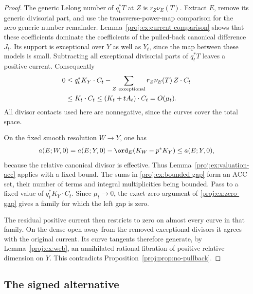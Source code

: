 \begin{proof}
The generic Lelong number of \(q_t^*T\) at \(Z\) is
\(r_Z\nu_E(T)\). Extract \(E\), remove its generic
divisorial part, and use the transverse-power-map
comparison for the zero-generic-number remainder.
Lemma~\ref{proj:ex:current-comparison} shows that these
coefficients dominate the coefficients of the pulled-back
canonical difference \(J_t\). Its support is exceptional
over \(Y\) as well as \(Y_t\), since the map between these
models is small. Subtracting all exceptional divisorial
parts of \(q_t^*T\) leaves a positive current. Consequently
\begin{equation}\label{proj:ex:bounded-gap}
 \begin{split}
 0&\leq q_t^*K_Y\cdot C_t
       -\sum_{Z\ {\rm exceptional}}
                r_Z\nu_E(T)\,Z\cdot C_t\\
  &\leq K_t\cdot C_t
   \leq (K_t+tA_t)\cdot C_t
   =O(\mu_t).
 \end{split}
\end{equation}
All divisor contacts used here are nonnegative, since the
curves cover the total space.

On the fixed smooth resolution \(W\to Y\), one has
\[
 a(E;W,0)=a(E;Y,0)
       -\ord_E(K_W-p^*K_Y)\leq a(E;Y,0),
\]
because the relative canonical divisor is effective.
Thus Lemma~\ref{proj:ex:valuation-acc} applies with a fixed
bound. The sums in \eqref{proj:ex:bounded-gap} form an ACC
set, their number of terms and integral multiplicities
being bounded. Pass to a fixed value of
\(q_t^*K_Y\cdot C_t\). Since \(\mu_t\to0\), the
exact-zero argument of \eqref{proj:ex:zero-gap} gives a family
for which the left gap is zero.

The residual positive current then restricts to zero on
almost every curve in that family. On the dense open
away from the removed exceptional divisors it agrees
with the original current. Its curve tangents therefore
generate, by Lemma~\ref{proj:ex:web}, an annihilated rational
fibration of positive relative dimension on \(Y\).
This contradicts Proposition~\ref{proj:prop:no-pullback}.
\end{proof}

\subsection{The signed alternative}


